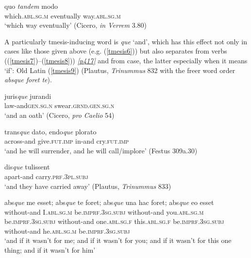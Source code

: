 \begin{exe}
\ex
\gll quo \emph{tandem} modo\\
which.\textsc{abl.sg.m} eventually way.\textsc{abl.sg.m}\\
\trans `which way eventually' (Cicero, \textit{in Verrem} 3.80)
\label{tmesis5}
\end{exe}

A particularly tmesis-inducing word is \emph{que} `and', which has this effect not only in cases like those given above (e.g. (\ref{tmesis6})) but also separates  from verbs ((\ref{tmesis7})--(\ref{tmesis8})) \hyperlink{p417}{\emph{[p417]}} and  from case, the latter especially when it means `if': Old Latin (\ref{tmesis9}) (Plautus, \textit{Trinummus} 832 with the freer word order \emph{absque foret te}).

\begin{exe}
\ex
\gll juris\emph{que} jurandi\\
law-and\textsc{gen.sg.n} swear.\textsc{grnd.gen.sg.n}\\ 
\trans `and an oath' (Cicero, \textit{pro Caelio} 54)
\label{tmesis6}
\end{exe}

\begin{exe}
\ex
\gll trans\emph{que} dato, endo\emph{que} plorato\\
across-and give.\textsc{fut.imp} in-and cry.\textsc{fut.imp}\\ 
\trans `and he will surrender, and he will call/implore' (Festus 309a.30)
\label{tmesis7}
\end{exe}

\begin{exe}
\ex
\gll dis\emph{que} tulissent\\
apart-and carry.\textsc{prf.3pl.subj}\\ 
\trans `and they have carried away' (Plautus, \textit{Trinummus} 833)
\label{tmesis8}
\end{exe}

\begin{exe}
\ex
\gll abs\emph{que} me esset; abs\emph{que} te foret; abs\emph{que} una hac foret; abs\emph{que} eo esset\\
without-and I.\textsc{abl.sg.m} be.\textsc{imprf.3sg.subj} without-and you.\textsc{abl.sg.m} be.\textsc{imprf.3sg.subj} without-and one.\textsc{abl.sg.f} this.\textsc{abl.sg.f} be.\textsc{imprf.3sg.subj} without-and he.\textsc{abl.sg.m} be.\textsc{imprf.3sg.subj}\\ 
\trans `and if it wasn't for me; and if it wasn't for you; and if it wasn't for this one thing; and if it wasn't for him'
\label{tmesis9}
\end{exe}

